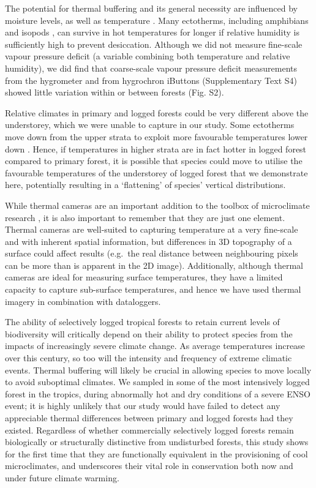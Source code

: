 \documentclass[12pt,a4paper,]{report}
\theoremstyle{definition}
\theoremstyle{definition}
\theoremstyle{definition}
\theoremstyle{remark}
\begin{document}
The potential for thermal buffering and its general necessity are
influenced by moisture levels, as well as temperature
\citep{mclaughlin_hydrologic2017}. Many ectotherms, including amphibians
\citep{duellman_biology1986} and isopods \citep{hassall_predicting2010},
can survive in hot temperatures for longer if relative humidity is
sufficiently high to prevent desiccation. Although we did not measure
fine-scale vapour pressure deficit (a variable combining both
temperature and relative humidity), we did find that coarse-scale vapour
pressure deficit measurements from the hygrometer and from hygrochron
iButtons (Supplementary Text S4) showed little variation within or
between forests (Fig. S2).

Relative climates in primary and logged forests could be very different
above the understorey, which we were unable to capture in our study.
Some ectotherms move down from the upper strata to exploit more
favourable temperatures lower down \citep{scheffers_increasing2013}.
Hence, if temperatures in higher strata are in fact hotter in logged
forest compared to primary forest, it is possible that species could
move to utilise the favourable temperatures of the understorey of logged
forest that we demonstrate here, potentially resulting in a `flattening'
of species' vertical distributions.

While thermal cameras are an important addition to the toolbox of
microclimate research \citep{faye_toolbox2016}, it is also important to
remember that they are just one element. Thermal cameras are well-suited
to capturing temperature at a very fine-scale and with inherent spatial
information, but differences in 3D topography of a surface could affect
results (e.g.~the real distance between neighbouring pixels can be more
than is apparent in the 2D image). Additionally, although thermal
cameras are ideal for measuring surface temperatures, they have a
limited capacity to capture sub-surface temperatures, and hence we have
used thermal imagery in combination with dataloggers.

The ability of selectively logged tropical forests to retain current
levels of biodiversity will critically depend on their ability to
protect species from the impacts of increasingly severe climate change.
As average temperatures increase over this century, so too will the
intensity and frequency of extreme climatic events. Thermal buffering
will likely be crucial in allowing species to move locally to avoid
suboptimal climates. We sampled in some of the most intensively logged
forest in the tropics, during abnormally hot and dry conditions of a
severe ENSO event; it is highly unlikely that our study would have
failed to detect any appreciable thermal differences between primary and
logged forests had they existed. Regardless of whether commercially
selectively logged forests remain biologically or structurally
distinctive from undisturbed forests, this study shows for the first
time that they are functionally equivalent in the provisioning of cool
microclimates, and underscores their vital role in conservation both now
and under future climate warming.
\end{document}
